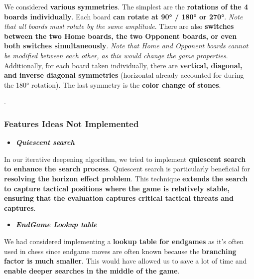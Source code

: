 \documentclass[11pt,a4paper]{report}
\begin{document}
\begin{answers}[23cm]

We considered \textbf{various symmetries}. The simplest are the \textbf{rotations of the 4 boards individually}. Each board \textbf{can rotate at 90° / 180° or 270°}. \textit{Note that all boards must rotate by the same amplitude}. There are also \textbf{switches between the two Home boards, the two Opponent boards, or even both switches simultaneously}. \textit{Note that Home and Opponent boards cannot be modified between each other, as this would change the game properties}. Additionally, for each board taken individually, there are \textbf{vertical, diagonal, and inverse diagonal symmetries} (horizontal already accounted for during the 180° rotation). The last symmetry is the \textbf{color change of stones}. 

. \\

\subsubsection{Features Ideas Not Implemented}

\begin{itemize}
    \item \textbf{\textit{Quiescent search}}
\end{itemize}

In our iterative deepening algorithm, we tried to implement \textbf{quiescent search to enhance the search process}. Quiescent search is particularly beneficial for \textbf{resolving the horizon effect problem}. This technique \textbf{extends the search to capture tactical positions where the game is relatively stable, ensuring that the evaluation captures critical tactical threats and captures}.


\begin{itemize}
    \item \textbf{\textit{EndGame Lookup table}}
\end{itemize}

We had considered implementing a \textbf{lookup table for endgames} as it's often used in chess since endgame moves are often known because the \textbf{branching factor is much smaller}. This would have allowed us to save a lot of time and \textbf{enable deeper searches in the middle of the game}.


\end{answers}
\end{document}
